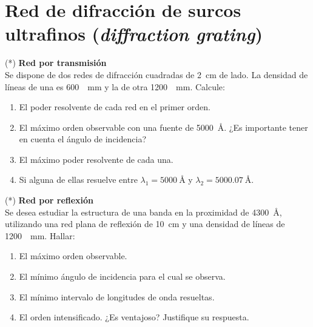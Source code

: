 \section*{Red de difracción de surcos ultrafinos (\emph{diffraction grating})}



\item (*) \textbf{Red por transmisión}\\
Se dispone de dos redes de difracción cuadradas de \SI{2}{\centi\metre} de lado.
La densidad de líneas de una es \SI{600}{\per\milli\metre} y la de otra \SI{1200}{\per\milli\metre}.
Calcule: 
\begin{enumerate}
	\item El poder resolvente de cada red en el primer orden. 
	\item El máximo orden observable con una fuente de \SI{5000}{\angstrom}. 
	¿Es importante tener en cuenta el ángulo de incidencia? 
	\item El máximo poder resolvente de cada una. 
	\item Si alguna de ellas resuelve entre $\lambda_1 = \SI{5000}{\angstrom}$ y $\lambda_2 = \SI{5000,07}{\angstrom}$.
\end{enumerate}




\item (*) \textbf{Red por reflexión}\\
Se desea estudiar la estructura de una banda en la proximidad de \SI{4300}{\angstrom}, utilizando una red plana de reflexión de \SI{10}{\centi\metre} y una densidad de líneas de \SI{1200}{\per\milli\metre}.
Hallar:
\begin{enumerate}
	\item El máximo orden observable. 
	\item El mínimo ángulo de incidencia para el cual se observa. 
	\item El mínimo intervalo de longitudes de onda resueltas. 
	\item El orden intensificado.
	¿Es ventajoso?
	Justifique su respuesta. 
\end{enumerate}

